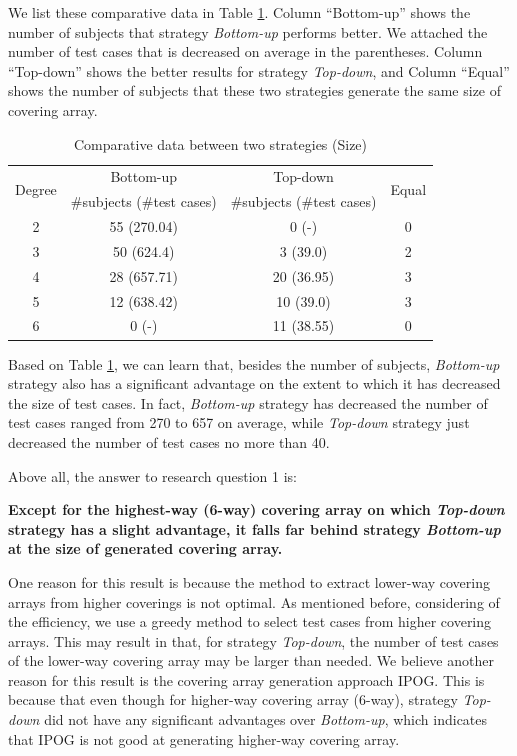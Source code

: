 \documentclass[conference]{IEEEtran}
\theoremstyle{definition}
\begin{document}
We list these comparative data in Table \ref{statistic_of_subjects_size}. Column ``Bottom-up'' shows the number of subjects that strategy \emph{Bottom-up} performs better. We attached the number of test cases that is decreased on average in the parentheses.  Column ``Top-down'' shows the better results for strategy \emph{Top-down}, and Column ``Equal'' shows the number of subjects that these two strategies generate the same size of covering array.


\begin{table}[!ht]
\caption{Comparative data between two strategies (Size) }
\label{statistic_of_subjects_size}
\center
    \begin{tabular}{|c|c|c|c|} \hline
\multirow{2}{*}{Degree} & Bottom-up & Top-down & \multirow{2}{*}{Equal} \\\cline{2-3}
 & \#subjects (\#test cases) & \#subjects (\#test cases) &  \\\hline
2 & 55 (270.04) & 0 (-) & 0 \\
3 & 50 (624.4) & 3 (39.0) & 2 \\
4 & 28 (657.71) & 20 (36.95) & 3 \\
5 & 12 (638.42) & 10 (39.0) & 3 \\
6 & 0 (-) & 11 (38.55) & 0 \\
        \hline
    \end{tabular}%
\end{table}

Based on Table \ref{statistic_of_subjects_size}, we can learn that, besides the number of subjects, \emph{Bottom-up} strategy also has a significant advantage on the extent to which it has decreased the size of test cases. In fact, \emph{Bottom-up} strategy has decreased the number of test cases ranged from 270 to 657 on average, while \emph{Top-down} strategy just decreased the number of test cases no more than 40.

Above all, the answer to research question 1 is:

\textbf{Except for the highest-way (6-way) covering array on which \emph{Top-down} strategy has a slight advantage, it falls far behind  strategy \emph{Bottom-up} at the size of generated covering array.}

One reason for this result is because the method to extract lower-way covering arrays from higher coverings is not optimal. As mentioned before, considering of the efficiency, we use a greedy method to select test cases from higher covering arrays. This may result in that, for strategy \emph{Top-down}, the number of test cases of the lower-way covering array may be larger than needed. We believe another reason for this result is the covering array generation approach IPOG. This is because that even though for higher-way covering array (6-way), strategy \emph{Top-down} did not have any significant advantages over \emph{Bottom-up}, which indicates that IPOG is not good at generating higher-way covering array.
\end{document}
